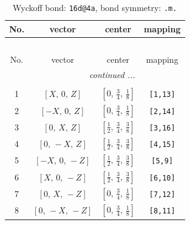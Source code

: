 \documentclass[fleqn,8pt]{jsarticle}
\begin{document}
\renewcommand{\arraystretch}{1.2}
\begin{longtable}{cccc}
\caption{Wyckoff bond: {\tt 16d@4a}, bond symmetry: {\tt .m.}}
 \\
 \hline \hline
No. & vector & center & mapping \\ \hline \endfirsthead

\multicolumn{3}{l}{\tablename\ \thetable{}} \\
 \hline \hline
No. & vector & center & mapping \\ \hline \endhead

 \hline \hline
\multicolumn{3}{r}{\footnotesize\it continued ...} \\ \endfoot

 \hline \hline
\multicolumn{3}{r}{} \\ \endlastfoot

1 & $\left[ X,\, 0,\, Z \right]$ & $\left[ 0,\, \frac{3}{4},\, \frac{1}{8} \right]$ & {\tt [1,13]} \\ \hline
2 & $\left[ - X,\, 0,\, Z \right]$ & $\left[ 0,\, \frac{3}{4},\, \frac{1}{8} \right]$ & {\tt [2,14]} \\ \hline
3 & $\left[ 0,\, X,\, Z \right]$ & $\left[ \frac{1}{2},\, \frac{3}{4},\, \frac{3}{8} \right]$ & {\tt [3,16]} \\ \hline
4 & $\left[ 0,\, - X,\, Z \right]$ & $\left[ \frac{1}{2},\, \frac{3}{4},\, \frac{3}{8} \right]$ & {\tt [4,15]} \\ \hline
5 & $\left[ - X,\, 0,\, - Z \right]$ & $\left[ \frac{1}{2},\, \frac{3}{4},\, \frac{3}{8} \right]$ & {\tt [5,9]} \\ \hline
6 & $\left[ X,\, 0,\, - Z \right]$ & $\left[ \frac{1}{2},\, \frac{3}{4},\, \frac{3}{8} \right]$ & {\tt [6,10]} \\ \hline
7 & $\left[ 0,\, X,\, - Z \right]$ & $\left[ 0,\, \frac{3}{4},\, \frac{1}{8} \right]$ & {\tt [7,12]} \\ \hline
8 & $\left[ 0,\, - X,\, - Z \right]$ & $\left[ 0,\, \frac{3}{4},\, \frac{1}{8} \right]$ & {\tt [8,11]} \\
\end{longtable}
\renewcommand{\arraystretch}{1.2}
\end{document}
